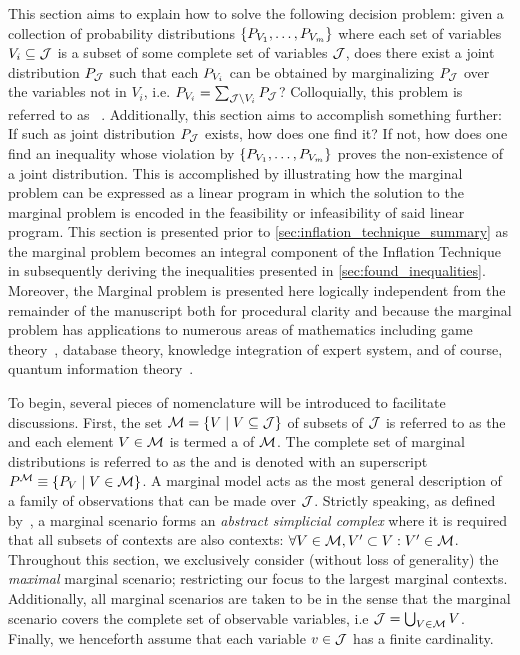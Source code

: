 \documentclass[aps, 10pt, english, twoside, pra, nofootinbib, tightenlines, longbibliography, superscriptaddress]{revtex4-1}
\begin{document}
    This section aims to explain how to solve the following decision problem: given a collection of probability distributions $\bc{\prob[V_1], \ldots, \prob[V_m]}$ where each set of variables $V_{i} \subseteq \mathcal{J}$ is a subset of some complete set of variables $\mathcal{J}$, does there exist a joint distribution $\prob[\jointvar]$ such that each $\prob[V_i]$ can be obtained by marginalizing $\prob[\jointvar]$ over the variables not in $V_i$, i.e. $\prob[V_i] = \sum_{\jointvar \setminus V_i} \prob[\jointvar]$? Colloquially, this problem is referred to as ~\cite{Fritz_2011}. Additionally, this section aims to accomplish something further: If such as joint distribution $\prob[\jointvar]$ exists, how does one find it? If not, how does one find an inequality whose violation by $\bc{\prob[V_1], \ldots, \prob[V_m]}$ proves the non-existence of a joint distribution. This is accomplished by illustrating how the marginal problem can be expressed as a linear program in which the solution to the marginal problem is encoded in the feasibility or infeasibility of said linear program. This section is presented prior to \cref{sec:inflation_technique_summary} as the marginal problem becomes an integral component of the Inflation Technique in subsequently deriving the inequalities presented in \cref{sec:found_inequalities}. Moreover, the Marginal problem is presented here logically independent from the remainder of the manuscript both for procedural clarity and because the marginal problem has applications to numerous areas of mathematics including game theory~\cite{Vorobev_1962}, database theory, knowledge integration of expert system, and of course, quantum information theory~\cite{Fritz_2011}.

    To begin, several pieces of nomenclature will be introduced to facilitate discussions. First, the set $\mscenario = \bc{V \mid V \subseteq \jointvar}$ of subsets of $\mathcal{J}$ is referred to as the  and each element $V \in \mathcal{M}$ is termed a  of $\mathcal{M}$. The complete set of marginal distributions is referred to as the  and is denoted with an superscript $\prob^{\mscenario} \defined \bc{\prob[V] \mid V \in \mscenario}$. A marginal model acts as the most general description of a family of observations that can be made over $\mathcal{J}$. Strictly speaking, as defined by~\cite{Fritz_2011}, a marginal scenario forms an \textit{abstract simplicial complex} where it is required that all subsets of contexts are also contexts: $\forall V \in \mathcal{M}, V' \subset V : V' \in \mathcal{M}$. Throughout this section, we exclusively consider (without loss of generality) the \textit{maximal} marginal scenario; restricting our focus to the largest marginal contexts. Additionally, all marginal scenarios are taken to be  in the sense that the marginal scenario covers the complete set of observable variables, i.e $\mathcal{J} = \bigcup_{V \in \mathcal{M}} V$. Finally, we henceforth assume that each variable $v \in \mathcal{J}$ has a finite cardinality.
\end{document}
